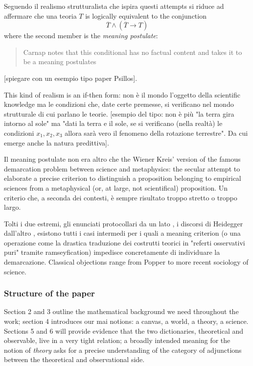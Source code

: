 Seguendo \cite{psillos} il realismo strutturalista che ispira questi attempts si riduce ad affermare che una teoria $T$ is logically equivalent to the conjunction
\[\overline{T} \land (\overline{T} \rightarrow T)
\] where the second member is the \emph{meaning postulate}:
\begin{quotation}
	Carnap notes that this conditional has no factual content and takes it to be a meaning postulates \cite{psillos}
\end{quotation}
[spiegare con un esempio tipo paper Psillos].

This kind of realism is an if-then form: non è il mondo l'oggetto della scientific knowledge ma le condizioni che, date certe premesse, si verificano nel mondo strutturale di cui parlano le teorie. [esempio del tipo: non è più "la terra gira intorno al sole" ma "dati la terra e il sole, se si verificano (nella realtà) le condizioni $x_1,x_2,x_3$ allora sarà vero il fenomeno della rotazione terrestre". Da cui emerge anche la natura predittiva]. 

Il meaning postulate non era altro che the Wiener Kreis' version of the famous demarcation problem between science and metaphysics: the secular attempt to elaborate a precise criterion to distinguish a proposition belonging to empirical sciences from a metaphysical (or, at large, not scientifical) proposition. Un criterio che, a seconda dei contesti, è sempre risultato troppo stretto o troppo largo. 

Tolti i due estremi, gli enunciati protocollari da un lato \cite{?}, i discorsi di Heidegger dall'altro \cite{?}, esistono tutti i casi intermedi per i quali a meaning criterion (o una operazione come la drastica traduzione dei costrutti teorici in "referti osservativi puri" tramite ramseyfication) impedisce concretamente di individuare la demarcazione. Classical objections range from Popper \cite{?} to more recent sociology of science.
\subsubsection*{Structure of the paper}
Section 2 and 3 outline the mathematical background we need throughout the work; section 4 introduces our mai notions: a canvas, a world, a theory, a science. Sections 5 and 6 will provide evidence that the two dictionaries, theoretical and observable, live in a very tight relation; a broadly intended meaning for the notion of \emph{theory} asks for a precise understanding of the category of adjunctions between the theoretical and observational side.
\color{black}
